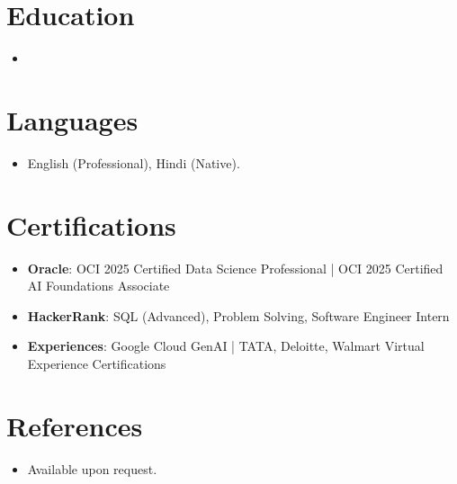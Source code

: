 \documentclass[11pt,a4paper,sans]{moderncv}
\begin{document}
\section{Education}
\vspace{1pt}
\begin{itemize}
\item{}
\end{itemize}

\section{Languages}
\vspace{1pt}
\begin{itemize}
\item English (Professional), Hindi (Native).
\end{itemize}

\section{Certifications}
\vspace{1pt}
\begin{itemize}
\item \textbf{Oracle}: OCI 2025 Certified Data Science Professional | OCI 2025 Certified AI Foundations Associate
\item \textbf{HackerRank}: SQL (Advanced), Problem Solving, Software Engineer Intern
\item \textbf{Experiences}: Google Cloud GenAI | TATA, Deloitte, Walmart Virtual Experience Certifications
\end{itemize}

\section{References}
\vspace{1pt}
\begin{itemize}
\item Available upon request.
\end{itemize}
\end{document}
